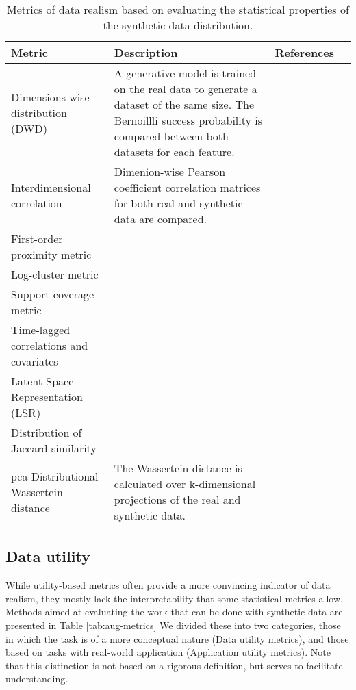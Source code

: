    \begin{table}
        \footnotesize
        \caption{Metrics of data realism based on evaluating the statistical properties of the synthetic data distribution. \label{tab:statistical}} 
        
        \begin{tabular}{@{} p{} p{} p{} p{} @{}}\toprule
            Metric & Description & References\\ \midrule
            Dimensions-wise distribution (DWD) & A generative model is trained on the real data to generate a dataset of the same size. The Bernoillli success probability is compared between both datasets for each feature. & \cite{Beaulieu-Jones2019-ct,choi2017generating,chin2019generation,yan2020generating,Baowaly2019,Baowaly_2019,ozyigit2020generation,tanti2019}\\
            Interdimensional correlation & Dimenion-wise Pearson coefficient correlation matrices for both real and synthetic data are compared. & \cite{Beaulieu-Jones2019-ct, Goncalves2020}\cite{torfi2019generating,Frid_Adar_2018,Yang_2019,ozyigit2020generation}\\
            First-order proximity metric & {} & \cite{Zhang2020-wp}\\
            Log-cluster metric & {} & \cite{Goncalves2020}\\
            Support coverage metric & {} & \cite{Goncalves2020}\\
            Time-lagged correlations and covariates & {} & \cite{Fisher2019,walsh2020generating}\\
            Latent Space Representation (LSR) & {} & \cite{yan2020generating}\\
            Distribution of Jaccard similarity & {} & \cite{ozyigit2020generation}\\
            \gls{pca} Distributional Wassertein distance & The Wassertein distance is calculated over k-dimensional projections of the real and synthetic data. & \cite{tanti2019}
            \bottomrule
        \end{tabular}
    \end{table}
    
    \subsection{Data utility}
         While utility-based metrics often provide a more convincing indicator of data realism, they mostly lack the interpretability that some statistical metrics allow. Methods aimed at evaluating the work that can be done with synthetic data are presented in Table \ref{tab:aug-metrics} We divided these into two categories, those in which the task is of a more conceptual nature (Data utility metrics), and those based on tasks with real-world application (Application utility metrics). Note that this distinction is not based on a rigorous definition, but serves to facilitate understanding.


